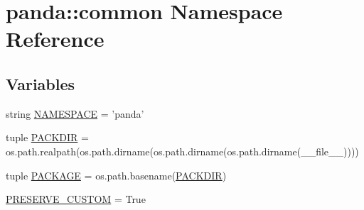 \hypertarget{namespacepanda_1_1common}{
\section{panda::common Namespace Reference}
\label{namespacepanda_1_1common}
}
\subsection*{Variables}
\begin{DoxyCompactItemize}
\item 
string \hyperlink{namespacepanda_1_1common_aea052ff12707bd23356da7a2b5e4a653}{NAMESPACE} = 'panda'
\item 
tuple \hyperlink{namespacepanda_1_1common_ab6475a34a0c73648191a04e503c41811}{PACKDIR} = os.path.realpath(os.path.dirname(os.path.dirname(os.path.dirname(\_\-\_\-file\_\-\_\-))))
\item 
tuple \hyperlink{namespacepanda_1_1common_a4143d30df292ff8e51f53f36d3dd2def}{PACKAGE} = os.path.basename(\hyperlink{namespacepanda_1_1common_ab6475a34a0c73648191a04e503c41811}{PACKDIR})
\item 
\hyperlink{namespacepanda_1_1common_afda67b2d5acec08a86a3d95d06374744}{PRESERVE\_\-CUSTOM} = True
\end{DoxyCompactItemize}


